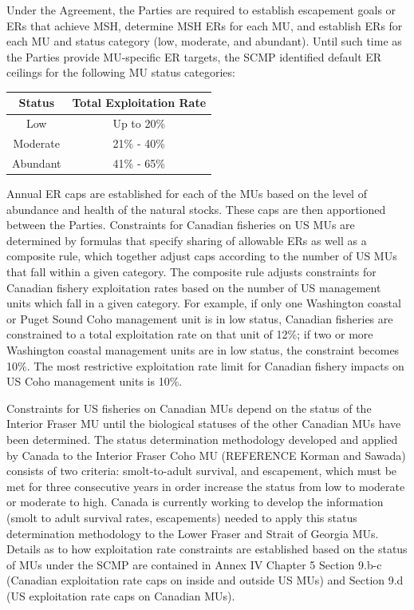 \documentclass[
  letterpaper,
  DIV=11,
  numbers=noendperiod]{scrartcl}
\begin{document}
Under the Agreement, the Parties are required to establish escapement
goals or ERs that achieve MSH, determine MSH ERs for each MU, and
establish ERs for each MU and status category (low, moderate, and
abundant). Until such time as the Parties provide MU-specific ER
targets, the SCMP identified default ER ceilings for the following MU
status categories:

\begin{longtable}[]{@{}cc@{}}
\toprule\noalign{}
\textbf{Status} & \textbf{Total Exploitation Rate} \\
\midrule\noalign{}
\endhead
\bottomrule\noalign{}
\endlastfoot
Low & Up to 20\% \\
Moderate & 21\% - 40\% \\
Abundant & 41\% - 65\% \\
\end{longtable}

Annual ER caps are established for each of the MUs based on the level of
abundance and health of the natural stocks. These caps are then
apportioned between the Parties. Constraints for Canadian fisheries on
US MUs are determined by formulas that specify sharing of allowable ERs
as well as a composite rule, which together adjust caps according to the
number of US MUs that fall within a given category. The composite rule
adjusts constraints for Canadian fishery exploitation rates based on the
number of US management units which fall in a given category. For
example, if only one Washington coastal or Puget Sound Coho management
unit is in low status, Canadian fisheries are constrained to a total
exploitation rate on that unit of 12\%; if two or more Washington
coastal management units are in low status, the constraint becomes 10\%.
The most restrictive exploitation rate limit for Canadian fishery
impacts on US Coho management units is 10\%.

Constraints for US fisheries on Canadian MUs depend on the status of the
Interior Fraser MU until the biological statuses of the other Canadian
MUs have been determined. The status determination methodology developed
and applied by Canada to the Interior Fraser Coho MU (REFERENCE Korman
and Sawada) consists of two criteria: smolt-to-adult survival, and
escapement, which must be met for three consecutive years in order
increase the status from low to moderate or moderate to high. Canada is
currently working to develop the information (smolt to adult survival
rates, escapements) needed to apply this status determination
methodology to the Lower Fraser and Strait of Georgia MUs. Details as to
how exploitation rate constraints are established based on the status of
MUs under the SCMP are contained in Annex IV Chapter 5 Section 9.b-c
(Canadian exploitation rate caps on inside and outside US MUs) and
Section 9.d (US exploitation rate caps on Canadian MUs).
\end{document}
